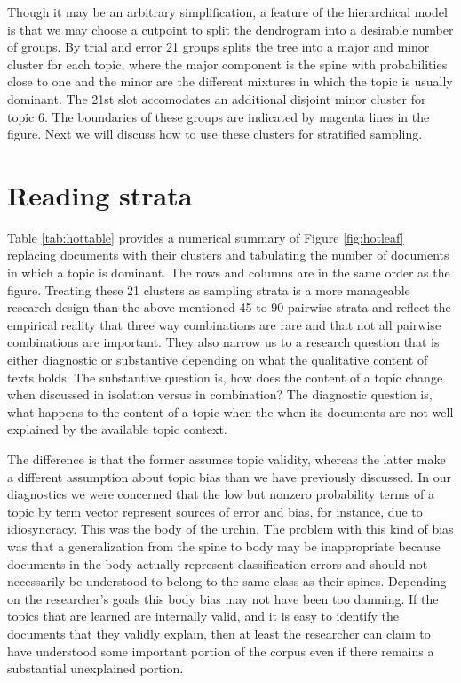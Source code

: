 \documentclass[]{book}
\theoremstyle{definition}
\theoremstyle{definition}
\theoremstyle{definition}
\theoremstyle{remark}
\begin{document}
Though it may be an arbitrary simplification, a feature of the
hierarchical model is that we may choose a cutpoint to split the
dendrogram into a desirable number of groups. By trial and error 21
groups splits the tree into a major and minor cluster for each topic,
where the major component is the spine with probabilities close to one
and the minor are the different mixtures in which the topic is usually
dominant. The 21st slot accomodates an additional disjoint minor cluster
for topic 6. The boundaries of these groups are indicated by magenta
lines in the figure. Next we will discuss how to use these clusters for
stratified sampling.

\hypertarget{reading-strata}{%
\section{Reading strata}\label{reading-strata}}

Table \ref{tab:hottable} provides a numerical summary of Figure
\ref{fig:hotleaf} replacing documents with their clusters and tabulating
the number of documents in which a topic is dominant. The rows and
columns are in the same order as the figure. Treating these 21 clusters
as sampling strata is a more manageable research design than the above
mentioned 45 to 90 pairwise strata and reflect the empirical reality
that three way combinations are rare and that not all pairwise
combinations are important. They also narrow us to a research question
that is either diagnostic or substantive depending on what the
qualitative content of texts holds. The substantive question is, how
does the content of a topic change when discussed in isolation versus in
combination? The diagnostic question is, what happens to the content of
a topic when the when its documents are not well explained by the
available topic context.

The difference is that the former assumes topic validity, whereas the
latter make a different assumption about topic bias than we have
previously discussed. In our diagnostics we were concerned that the low
but nonzero probability terms of a topic by term vector represent
sources of error and bias, for instance, due to idiosyncracy. This was
the body of the urchin. The problem with this kind of bias was that a
generalization from the spine to body may be inappropriate because
documents in the body actually represent classification errors and
should not necessarily be understood to belong to the same class as
their spines. Depending on the researcher's goals this body bias may not
have been too damning. If the topics that are learned are internally
valid, and it is easy to identify the documents that they validly
explain, then at least the researcher can claim to have understood some
important portion of the corpus even if there remains a substantial
unexplained portion.
\end{document}
